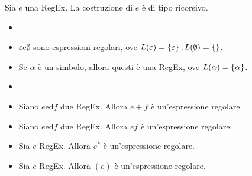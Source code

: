 \documentclass{subfiles}
\begin{document}
Sia \(e\) una RegEx. La costruzione di \(e\) è di tipo ricorsivo.
\begin{Base*}
    \begin{itemize}
        \item []
        \item \(\varepsilon \text{e} \emptyset\) sono espressioni regolari, ove \(L(\varepsilon) = \left\{\varepsilon\right\}, L(\emptyset) = \left\{\right\}\).
        \item Se \(\alpha\) è un simbolo, allora questi è una RegEx, ove \(L(\alpha) = \left\{\alpha\right\}\).
    \end{itemize}
\end{Base*}
\begin{Induction*}
    \begin{itemize}
        \item []
        \item Siano \(e \text{ed} f\) due RegEx. Allora \(e + f\) è un'espressione regolare.
        \item Siano \(e \text{ed} f\) due RegEx. Allora \(ef\) è un'espressione regolare.
        \item Sia \(e\) RegEx. Allora \(e^{*}\) è un'espressione regolare.
        \item Sia \(e\) RegEx. Allora \((e)\) è un'espressione regolare.
    \end{itemize}
\end{Induction*}
\end{document}
